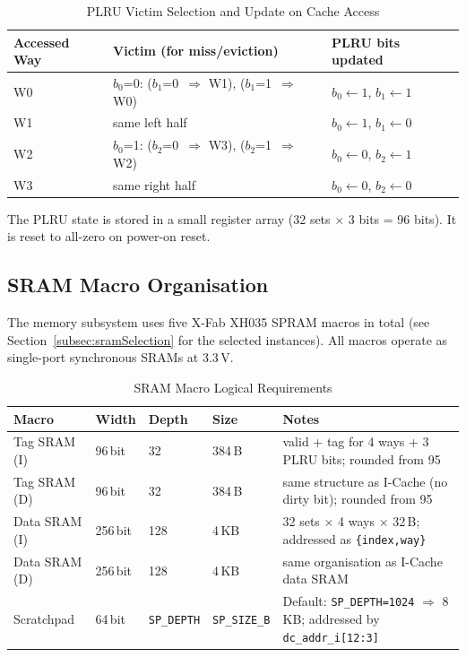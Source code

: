 \begin{table}[H]
\caption{PLRU Victim Selection and Update on Cache Access}
\label{tab:asPlruUpdate}
\centering
\begin{tabularx}{\textwidth}{|l |l |X|}
  \hline
  Accessed Way & Victim (for miss/eviction) & PLRU bits updated \\
  \hline
  \hline
  W0 & $b_0$=0: ($b_1$=0~$\Rightarrow$ W1), ($b_1$=1~$\Rightarrow$ W0) & $b_0 \leftarrow 1$,\; $b_1 \leftarrow 1$ \\
  \hline
  W1 & same left half & $b_0 \leftarrow 1$,\; $b_1 \leftarrow 0$ \\
  \hline
  W2 & $b_0$=1: ($b_2$=0~$\Rightarrow$ W3), ($b_2$=1~$\Rightarrow$ W2) & $b_0 \leftarrow 0$,\; $b_2 \leftarrow 1$ \\
  \hline
  W3 & same right half & $b_0 \leftarrow 0$,\; $b_2 \leftarrow 0$ \\
  \hline
\end{tabularx}
\end{table}

The PLRU state is stored in a small register array (32 sets $\times$ 3 bits = 96 bits).
It is reset to all-zero on power-on reset.

\subsection{SRAM Macro Organisation}
\label{subsec:sramMacros}

The memory subsystem uses five X-Fab XH035 SPRAM macros in total
(see Section~\ref{subsec:sramSelection} for the selected instances).
All macros operate as single-port synchronous SRAMs at 3.3\,V.

\begin{table}[H]
\caption{SRAM Macro Logical Requirements}
\label{tab:asSramMacros}
\centering
\begin{tabularx}{\textwidth}{|l |l |l |l |X|}
  \hline
  Macro & Width & Depth & Size & Notes \\
  \hline
  \hline
  Tag SRAM (I)  & 96\,bit  & 32   & 384\,B   & valid + tag for 4 ways + 3 PLRU bits; rounded from 95 \\
  \hline
  Tag SRAM (D)  & 96\,bit  & 32   & 384\,B   & same structure as I-Cache (no dirty bit); rounded from 95 \\
  \hline
  Data SRAM (I) & 256\,bit & 128  & 4\,KB    & 32 sets $\times$ 4 ways $\times$ 32\,B; addressed as \texttt{\{index,way\}} \\
  \hline
  Data SRAM (D) & 256\,bit & 128  & 4\,KB    & same organisation as I-Cache data SRAM \\
  \hline
  Scratchpad    & 64\,bit  & \texttt{SP\_DEPTH} & \texttt{SP\_SIZE\_B} &
    Default: \texttt{SP\_DEPTH=1024} $\Rightarrow$ 8\,KB;
    addressed by \texttt{dc\_addr\_i[12:3]} \\
  \hline
\end{tabularx}
\end{table}

